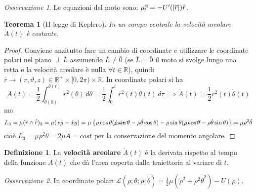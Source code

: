 \documentclass{book}
\theoremstyle{plain}
\newtheorem{teo}{Teorema}[chapter]
\theoremstyle{plain}
\theoremstyle{plain}
\theoremstyle{plain}
\theoremstyle{plain}
\theoremstyle{definition}
\newtheorem{defi}{Definizione}[chapter]
\theoremstyle{remark}
\newtheorem*{oss}{Osservazione}
\theoremstyle{definition}
\begin{document}
\begin{oss}
    Le equazioni del moto sono: $\mu\Ddot{\overline{r}}=-U'(|\overline{r}|)\hat{r}$.
\end{oss}

\begin{teo}[II legge di Keplero]
    In un campo centrale la velocità areolare $\Dot{A}(t)$ è costante.
\end{teo}

\begin{proof}
    Conviene anzitutto fare un cambio di coordinate e utilizzare le coordinate polari nel piano $\perp\overline{L}$ assumendo $\overline{L}\neq\overline{0}$ (se $\overline{L}=\overline{0}$ il moto si svolge lungo una retta e la velocità areolare è nulla $\forall t\in\mathbb{R}$), quindi $\overline{r}\to(r,\vartheta,z)\in\mathbb{R}^+\times[0,2\pi)\times\mathbb{R}$. In coordinate polari si ha
    \begin{displaymath}
        A(t)=\frac{1}{2}\int_{\theta(0)}^{\theta(t)}r^2(\theta)\,d\theta=\frac{1}{2}\int_0^tr^2(t)\Dot{\theta}(t)\,d\tau\implies\Dot{A}(t)=\frac{1}{2}r^2(t)\Dot{\theta}(t)
    \end{displaymath}
    ma
    \begin{displaymath}
        L_3=\mu(\overline{r}\wedge\Dot{\overline{r}})_3=\mu(x\Dot{y}-\Dot{x}y)=\mu\left\{\rho\cos{\theta}(\cancel{\Dot{\rho}\sin{\theta}}-\rho\Dot{\theta}\cos{\theta})-\rho\sin{\theta}(\cancel{\Dot{\rho}\cos{\theta}}-\rho\Dot{\theta}\sin{\theta})\right\}=\mu\rho^2\Dot{\theta}
    \end{displaymath}
    cioè $L_3=\mu\rho^2\Dot{\theta}=2\mu\Dot{A}=cost$ per la conservazione del momento angolare.
\end{proof}

\begin{defi}
    La \textbf{velocità areolare} $\Dot{A}(t)$ è la derivata rispetto al tempo della funzione $A(t)$ che dà l'area coperta dalla traiettoria al variare di $t$. 
\end{defi}

\begin{oss}
    In coordinate polari $\mathcal{L}(\rho;\theta;\dot{\rho};\dot{\theta}) = \frac{1}{2}\mu (\dot{\rho}^2+\rho^2 \dot{\theta}^2) -U(\rho)$.
\end{oss}
\end{document}
